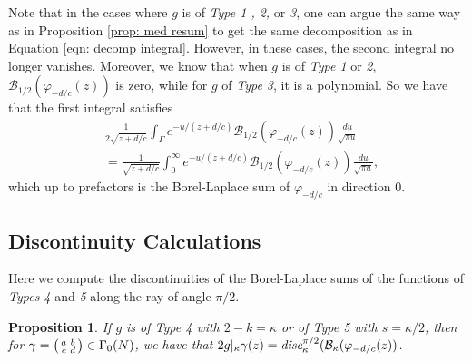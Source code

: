 \documentclass[12pt]{amsart}
\theoremstyle{definition}
\theoremstyle{plain}
\newtheorem{prop}[theorem]{Proposition}
\numberwithin{equation}{section}
\begin{document}
Note that in the cases where $g$ is of \emph{Type 1 , 2,} or \emph{3}, one can argue the same way as in Proposition \ref{prop: med resum} to get the same decomposition as in 
 Equation \ref{eqn: decomp integral}. However, in these cases, the second integral no longer vanishes. Moreover, we know that when $g$ is of \emph{Type 1} or \emph{2},  $\mathcal{B}_{1/2}(\varphi_{-d/c}(z))$ is zero, while for $g$ of \emph{Type 3}, it is a polynomial. So we have that the first integral satisfies
\begin{align*}&\frac{1}{2\sqrt{z+d/c}} \int_{\Gamma}e^{-u/(z+d/c)} \mathcal{B}_{1/2}(\varphi_{-d/c}(z)) \frac{du}{\sqrt{\pi u}}\\&= \frac{1}{\sqrt{z+d/c}} \int_{0}^{\infty}e^{-u/(z+d/c)} \mathcal{B}_{1/2}(\varphi_{-d/c}(z)) \frac{du}{\sqrt{\pi u}},\end{align*}
which up to prefactors is the Borel-Laplace sum of $\varphi_{-d/c}$ in direction 0. 

\subsection{Discontinuity Calculations} \label{subsec: discontinuity} Here we compute the discontinuities of the Borel-Laplace sums of the functions of \emph{Types 4} and \emph{5} along the ray of angle $\pi/2$. 

\begin{prop}\label{prop: eichler discont}
	If $g$ is of Type 4 with $2-k= \kappa$ or of Type 5 with $s = \kappa/2$, then  for $\gamma = \begin{psmallmatrix} a & b \\ c & d \end{psmallmatrix} \in \Gamma_0(N)$, we have that 
 $2g|_{\kappa}\gamma(z) = \emph{disc}_\kappa^{\pi/2}(\mathcal{B}_\kappa(\varphi_{-d/c}(z))$.
\end{prop}
\end{document}
